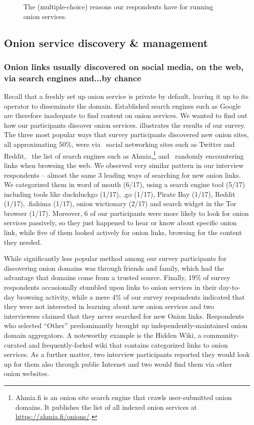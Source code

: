 \begin{figure}[t]
    \centering
    
    \caption{The (multiple-choice) reasons our respondents have for running
    onion services.}
    \label{fig:onion-operation-reasons}
\end{figure}

\subsection{Onion service discovery \& management}
\label{sec:manage}

\subsubsection{Onion links usually discovered on social media, on the web, via search engines and...by chance }
Recall that a freshly set up onion service is private by default, leaving it up
to its operator to disseminate the domain.  Established search engines such as
Google are therefore inadequate to find content on onion services.  We wanted to
find out how our participants discover onion services.
 illustrates the results of our survey.  The three most popular ways
that survey participants discovered new onion sites, all approximating 50\%, were via \first~social
networking sites such as Twitter and Reddit, \second~the list of search engines
such as Ahmia,\footnote{Ahmia.fi is an onion site search engine that crawls
user-submitted onion domains.  It publishes the list of all indexed onion
services at \url{https://ahmia.fi/onions/}.} and \third~randomly encountering
links when browsing the web. 
We observed very similar pattern in our interview respondents – almost the same 3 leading ways of searching for new onion links.  We categorized them in word of mouth (6/17), using a search engine tool (5/17) including tools like duckduckgo (1/17), .go (1/17), Pirate Bay (1/17), Reddit (1/17), .fiahima (1/17), onion wictionary (2/17) and search widget in the Tor browser (1/17). Moreover, 6 of our participants were more likely to look for onion services passively, so they just happened to hear or know about specific onion link, while five of them looked actively for onion links, browsing for the content they needed.

While significantly less popular method among our survey participants for discovering onion domains was through friends and
family, which had the advantage that domains come from a trusted source. 
Finally, 19\% of survey respondents occasionally
stumbled upon links to onion services in their day-to-day browsing activity, while
a mere
4\% of our survey respondents indicated that they were not interested in learning about new onion services and two interviewees claimed that they never searched for new Onion links.
Respondents who selected ``Other'' predominantly brought up
independently-maintained onion domain aggregators.  A noteworthy example is the
Hidden Wiki, a community-curated and frequently-forked wiki that contains
categorized links to onion services.  As a further matter, two interview participants reported they would look up for them also through public Internet and two would find them via other onion websites.

